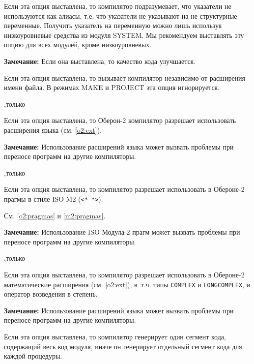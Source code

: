 \begin{description}
Если эта опция выставлена, то компилятор подразумевает, что
указатели не используются как алиасы, т.е. что указатели не указывают 
на не структурные переменные. Получить указатель на переменную 
можно лишь используя низкоуровневые средства из модуля
SYSTEM. Мы рекомендуем выставлять эту опцию для всех модулей,
кроме низкоуровневых.

{\bf Замечание:} Если она выставлена, то качество кода улучшается.
\fi

        \MLBegin{}\ModeC{}\MLEnd{}

Если эта опция выставлена, то \xds{} 
вызывает \ot{} компилятор независимо от расширения имени файла.
В режимах MAKE и PROJECT эта опция игнорируется.


        \MLBegin{}\ModeC{},только \ot{}\MLEnd{} \header

Если эта опция выставлена, то Оберон-2 компилятор разрешает
использовать расширения языка (см. \ref{o2:ext}).

{\bf Замечание:} Использование расширений языка может вызвать 
проблемы при переносе программ на другие компиляторы.

        \MLBegin{}\ModeC{},только \ot{}\MLEnd{}

Если эта опция выставлена, то компилятор разрешает использовать
в Обероне-2 прагмы в стиле ISO M2 (\verb|<* *>|).

        См. \ref{o2:pragmas} и \ref{m2:pragmas}.

{\bf Замечание:} Использование ISO Модула-2 прагм может вызвать 
проблемы при переносе программ на другие компиляторы.

        \MLBegin{}\ModeC{},только \ot{}\MLEnd{} \header

Если эта опция выставлена, то компилятор разрешает использовать
в Обероне-2 математические расширения (см. \ref{o2:ext}),
в~т.ч. типы {\tt COMPLEX} и {\tt LONGCOMPLEX}, и 
оператор возведения в степень. 

{\bf Замечание:} Использование расширений языка может вызвать 
проблемы при переносе программ на другие компиляторы.

\ifgencode
{}
        \MLBegin{}\ModeC{}\MLEnd{}

Если эта опция выставлена, то компилятор генерирует один сегмент кода,
содержащий весь код модуля, иначе он генерирует отдельный сегмент кода 
для каждой процедуры.
\fi


\end{description}
